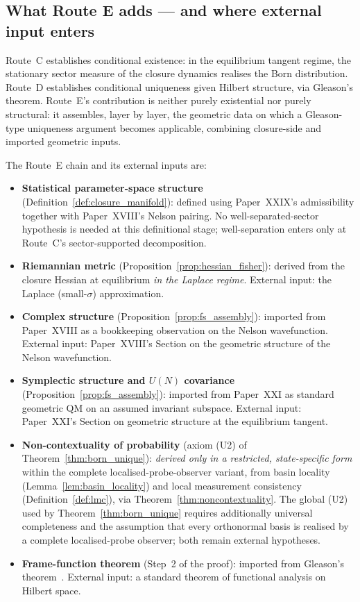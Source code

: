 \documentclass[12pt]{article}
\begin{document}
\subsection{What Route E adds --- and where external input enters}\label{subsec:route_e_delta}

Route~C establishes conditional existence: in the equilibrium tangent regime, the stationary sector measure of the closure dynamics realises the Born distribution. Route~D establishes conditional uniqueness given Hilbert structure, via Gleason's theorem. Route~E's contribution is neither purely existential nor purely structural: it assembles, layer by layer, the geometric data on which a Gleason-type uniqueness argument becomes applicable, combining closure-side and imported geometric inputs.

The Route~E chain and its external inputs are:

\begin{itemize}
    \item \textbf{Statistical parameter-space structure} (Definition~\ref{def:closure_manifold}): defined using Paper~XXIX's admissibility together with Paper~XVIII's Nelson pairing. No well-separated-sector hypothesis is needed at this definitional stage; well-separation enters only at Route~C's sector-supported decomposition.
    \item \textbf{Riemannian metric} (Proposition~\ref{prop:hessian_fisher}): derived from the closure Hessian at equilibrium \emph{in the Laplace regime}. External input: the Laplace (small-$\sigma$) approximation.
    \item \textbf{Complex structure} (Proposition~\ref{prop:fs_assembly}): imported from Paper~XVIII as a bookkeeping observation on the Nelson wavefunction. External input: Paper~XVIII's Section on the geometric structure of the Nelson wavefunction.
    \item \textbf{Symplectic structure and $U(N)$ covariance} (Proposition~\ref{prop:fs_assembly}): imported from Paper~XXI as standard geometric QM on an assumed invariant subspace. External input: Paper~XXI's Section on geometric structure at the equilibrium tangent.
    \item \textbf{Non-contextuality of probability} (axiom (U2) of Theorem~\ref{thm:born_unique}): \emph{derived only in a restricted, state-specific form} within the complete localised-probe-observer variant, from basin locality (Lemma~\ref{lem:basin_locality}) and local measurement consistency (Definition~\ref{def:lmc}), via Theorem~\ref{thm:noncontextuality}. The global (U2) used by Theorem~\ref{thm:born_unique} requires additionally universal completeness and the assumption that every orthonormal basis is realised by a complete localised-probe observer; both remain external hypotheses.
    \item \textbf{Frame-function theorem} (Step~2 of the proof): imported from Gleason's theorem~\citep{Gleason1957,Peres1995,CookKeaneMoran1985}. External input: a standard theorem of functional analysis on Hilbert space.
\end{itemize}
\end{document}
